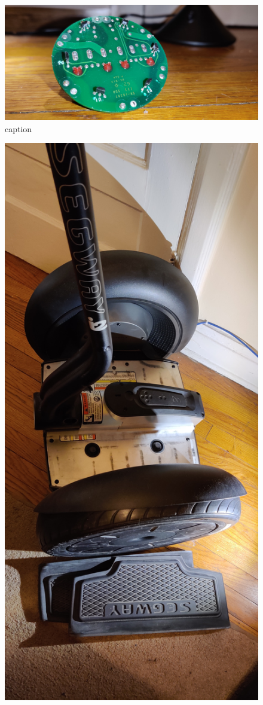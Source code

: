 \documentclass[]{formalLabReport}
\begin{document}
\begin{figure}
    \includegraphics[]{segwayMotorPCBRear.jpg}
    \caption{caption}
    \label{fig:segwayMotorPCBRear.jpg}
\end{figure}

\begin{figure}
    \includegraphics[]{segwayPadsRemoved.jpg}

\end{figure}
\end{document}

